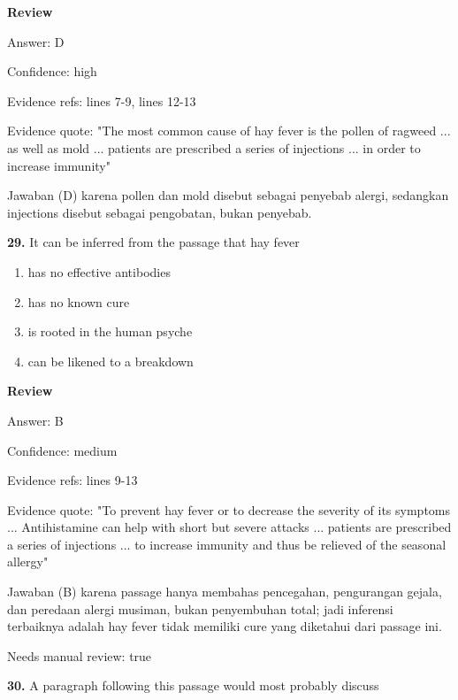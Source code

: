 \documentclass[12pt]{article}
\begin{document}
\par
\begingroup
\setlength{\parskip}{0pt}
\setlength{\parindent}{0pt}
\textbf{Review}\par
Answer: D\par
Confidence: high\par
Evidence refs: lines 7-9, lines 12-13\par
Evidence quote: "The most common cause of hay fever is the pollen of ragweed ... as well as mold ... patients are prescribed a series of injections ... in order to increase immunity"\par
Jawaban (D) karena pollen dan mold disebut sebagai penyebab alergi, sedangkan injections disebut sebagai pengobatan, bukan penyebab.\par
\endgroup
\par
\vspace{0.25\baselineskip}
\noindent\textbf{29.} It can be inferred from the passage that hay fever
\begin{enumerate}[label=(\Alph*),leftmargin=*,itemsep=0.2em]
\item has no effective antibodies
\item has no known cure
\item is rooted in the human psyche
\item can be likened to a breakdown
\end{enumerate}
\par
\begingroup
\setlength{\parskip}{0pt}
\setlength{\parindent}{0pt}
\textbf{Review}\par
Answer: B\par
Confidence: medium\par
Evidence refs: lines 9-13\par
Evidence quote: "To prevent hay fever or to decrease the severity of its symptoms ... Antihistamine can help with short but severe attacks ... patients are prescribed a series of injections ... to increase immunity and thus be relieved of the seasonal allergy"\par
Jawaban (B) karena passage hanya membahas pencegahan, pengurangan gejala, dan peredaan alergi musiman, bukan penyembuhan total; jadi inferensi terbaiknya adalah hay fever tidak memiliki cure yang diketahui dari passage ini.\par
Needs manual review: true\par
\endgroup
\par
\vspace{0.25\baselineskip}
\noindent\textbf{30.} A paragraph following this passage would most probably discuss
\end{document}
